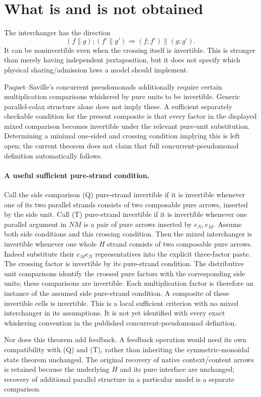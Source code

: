 \documentclass[11pt]{article}
\begin{document}
\section{What is and is not obtained}
The interchanger has the direction
\[
 (f\parallel g);(f'\parallel g')\Longrightarrow
 (f;f')\parallel(g;g').
\]
It can be noninvertible even when the crossing itself is invertible. This is stronger than merely having independent juxtaposition, but it does not specify which physical sharing/admission laws a model should implement.

Paquet--Saville's concurrent pseudomonads additionally require certain multiplication comparisons whiskered by pure units to be invertible. Generic parallel-colax structure alone does not imply these. A sufficient separately checkable condition for the present composite is that every factor in the displayed mixed comparison becomes invertible under the relevant pure-unit substitution. Determining a minimal one-sided and crossing condition implying this is left open; the current theorem does not claim that full concurrent-pseudomonad definition automatically follows.

\paragraph{A useful sufficient pure-strand condition.}
Call the side comparison (Q) pure-strand invertible if it is invertible whenever one of its two parallel strands consists of two composable pure arrows, inserted by the side unit. Call (T) pure-strand invertible if it is invertible whenever one parallel argument in $NM$ is a pair of pure arrows inserted by $e_N,e_M$. Assume both side conditions and this crossing condition. Then the mixed interchanger is invertible whenever one whole $H$ strand consists of two composable pure arrows. Indeed substitute their $e_Me_N$ representatives into the explicit three-factor paste. The crossing factor is invertible by its pure-strand condition. The distributive unit comparisons identify the crossed pure factors with the corresponding side units; these comparisons are invertible. Each multiplication factor is therefore an instance of the assumed side pure-strand condition. A composite of these invertible cells is invertible. This is a local sufficient criterion with no mixed interchanger in its assumptions. It is not yet identified with every exact whiskering convention in the published concurrent-pseudomonad definition.

Nor does this theorem add feedback. A feedback operation would need its own compatibility with (Q) and (T), rather than inheriting the symmetric-monoidal state theorem unchanged. The original recovery of native context/content arrows is retained because the underlying $H$ and its pure interface are unchanged; recovery of additional parallel structure in a particular model is a separate comparison.
\end{document}
